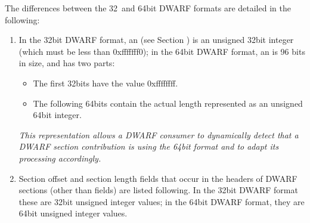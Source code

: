 The differences between the 32\dash\   and 64\dash bit 
DWARF formats are
detailed in the following:
\begin{enumerate}[1.]
\item  In the 32\dash bit DWARF format, an 
(see 
Section ) 
is an unsigned 32\dash bit integer (which
must be less than 0xfffffff0); in the 64\dash bit DWARF format,
an  is 96 bits in size,
and has two parts:
\begin{itemize}
\item The first 32\dash bits have the value 0xffffffff.

\item  The following 64\dash bits contain the actual length
represented as an unsigned 64\dash bit integer.
\end{itemize}

\textit{This representation allows a DWARF consumer to dynamically
detect that a DWARF section contribution is using the 64\dash bit
format and to adapt its processing accordingly.}

\item Section offset and section length 
fields that occur
in the headers of DWARF sections (other 
than 
fields) are listed following. In the 32\dash bit DWARF format these
are 32\dash bit unsigned integer values; in the 64\dash bit DWARF format,
they 
are 
64\dash bit 
unsigned integer values.


\end{enumerate}
